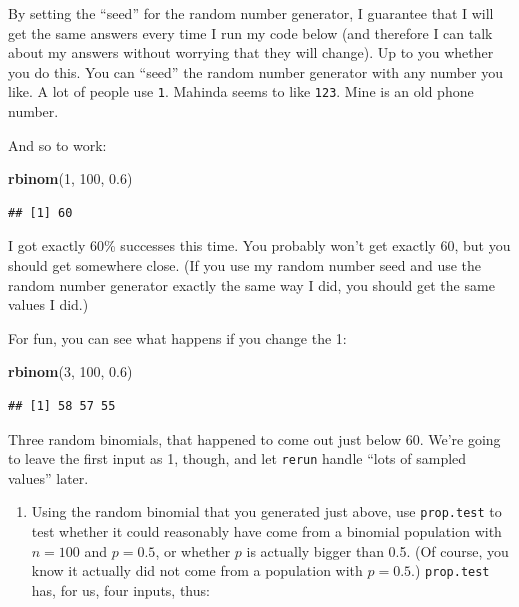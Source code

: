 \documentclass[]{tufte-book}
\newenvironment{Shaded}{}{}
\newcommand{\DecValTok}[1]{\textcolor[rgb]{0.25,0.63,0.44}{#1}}
\newcommand{\FloatTok}[1]{\textcolor[rgb]{0.25,0.63,0.44}{#1}}
\newcommand{\KeywordTok}[1]{\textcolor[rgb]{0.00,0.44,0.13}{\textbf{#1}}}
\newcommand{\NormalTok}[1]{#1}
\providecommand{\tightlist}{%
  \setlength{\itemsep}{0pt}\setlength{\parskip}{0pt}}
\theoremstyle{definition}
\theoremstyle{definition}
\theoremstyle{definition}
\theoremstyle{remark}
\begin{document}
By setting the ``seed'' for the random number generator, I guarantee
that I will get the same answers every time I run my code below (and
therefore I can talk about my answers without worrying that they will
change). Up to you whether you do this. You can ``seed'' the random
number generator with any number you like. A lot of people use
\texttt{1}. Mahinda seems to like \texttt{123}. Mine is an old phone
number.

And so to work:

\begin{Shaded}
\begin{Highlighting}[]
\KeywordTok{rbinom}\NormalTok{(}\DecValTok{1}\NormalTok{, }\DecValTok{100}\NormalTok{, }\FloatTok{0.6}\NormalTok{)}
\end{Highlighting}
\end{Shaded}

\begin{verbatim}
## [1] 60
\end{verbatim}

I got exactly 60\% successes this time. You probably won't get exactly
60, but you should get somewhere close. (If you use my random number
seed and use the random number generator exactly the same way I did, you
should get the same values I did.)

For fun, you can see what happens if you change the 1:

\begin{Shaded}
\begin{Highlighting}[]
\KeywordTok{rbinom}\NormalTok{(}\DecValTok{3}\NormalTok{, }\DecValTok{100}\NormalTok{, }\FloatTok{0.6}\NormalTok{)}
\end{Highlighting}
\end{Shaded}

\begin{verbatim}
## [1] 58 57 55
\end{verbatim}

Three random binomials, that happened to come out just below 60. We're
going to leave the first input as 1, though, and let \texttt{rerun}
handle ``lots of sampled values'' later.

\begin{enumerate}
\def\labelenumi{(\alph{enumi})}
\setcounter{enumi}{1}
\tightlist
\item
  Using the random binomial that you generated just above, use
  \texttt{prop.test} to test whether it could reasonably have come from
  a binomial population with \(n=100\) and \(p=0.5\), or whether \(p\)
  is actually bigger than 0.5. (Of course, you know it actually did not
  come from a population with \(p=0.5\).) \texttt{prop.test} has, for
  us, four inputs, thus:
\end{enumerate}
\end{document}

